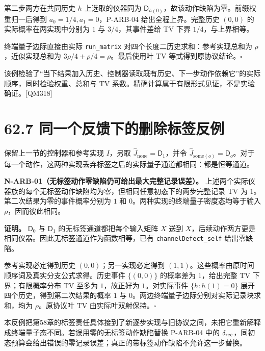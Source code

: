 \documentclass[
  11pt,
  oneside]{book}
\begin{document}
第二步两方在共同历史 \(h\) 上选取的仪器同为
\(\mathsf D_{h(0)}\)，故该动作缺陷为零。前缀权重归一后得到
\(a_0=1/4,a_1=0\)，P-ARB-04 给出全程上界。完整历史 \((0,0)\)
的实际概率在两实现中分别为 \(1\) 与 \(3/4\)，其事件差给 TV 下界
\(1/4\)，与上界相等。

终端量子边际直接由实际 \texttt{run\_\allowbreak matrix}
对四个长度二历史求和：参考实现总和为 \(\rho\)，近似实现总和为
\(3\rho/4+\rho/4=\rho\)。最后使用叶 TV 等式得到原协议结论。\(\square\)

该例检验了``当下结果加入历史、控制器读取既有历史、下一步动作依赖它''的实际顺序，同时检验权重、总和与
TV 系数。精确计算属于有限形式见证，不是实验确证。{[}QM318{]}

\hypertarget{ux540cux4e00ux4e2aux53cdux9988ux4e0bux7684ux5220ux9664ux6807ux7b7eux53cdux4f8b}{%
\section{62.7
同一个反馈下的删除标签反例}\label{ux540cux4e00ux4e2aux53cdux9988ux4e0bux7684ux5220ux9664ux6807ux7b7eux53cdux4f8b}}

保留上一节的控制器和参考实现 \(I\)，另取
\(\widehat J_{\mathrm{none}}=\mathsf D_1\)，并令
\(\widehat J_{\mathrm{some}(o)}=\mathsf D_o\)。对于每一个动作，这两种实现丢弃标签之后的实际量子通道都相同：都是恒等通道。

\protect\hypertarget{n-arb-01}{}{}

\textbf{N-ARB-01（无标签动作零缺陷仍可给出最大完整记录误差）。}
上述两个实际仪器族的每个无标签动作缺陷均为零，但相同任意初态下的两步完整记录
TV 为 \(1\)。第二次结果为零的事件概率分别为 \(1\) 和
\(0\)。两种实现的终端量子密度态均等于输入 \(\rho\)，因而彼此相同。

\textbf{证明。} \(\mathsf D_0\) 与 \(\mathsf D_1\)
的无标签通道都把每个输入矩阵 \(X\) 送到
\(X\)，后续动作两方更是相同仪器。因此无标签通道作为函数相等，已有
\texttt{channelDefect\_\allowbreak self} 给出零缺陷。

参考实现必定得到历史 \((0,0)\)；另一实现必定得到
\((1,1)\)。这些概率由原时间顺序词及真实分支公式求得。历史事件
\(\{(0,0)\}\) 的概率差为 \(1\)，给出完整 TV 下界；有限概率分布 TV 至多为
\(1\)，故正好为 \(1\)。对实际事件 \(\{h:h(1)=0\}\)
展开四个历史，得到第二次结果的概率 \(1\) 与
\(0\)。两边终端量子边际分别对实际记录块求和，均为 \(\rho\)。原协议叶 TV
由实际叶双射保持。\(\square\)

本反例把第58章的标签责任具体接到了新逐步实现与旧协议之间，未把它重新解释成终端量子态不同。若误用零的无标签动作缺陷替换
P-ARB-04 中的
\(\delta_{\rm rec}\)，同初态预算会给出错误的零记录误差；真正的带标签动作缺陷不允许这一步替换。
\end{document}
